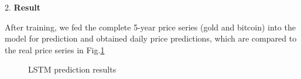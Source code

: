 \documentclass{mcmthesis}
\begin{document}
2. \textbf{Result}

After training, we fed the complete 5-year price series (gold and bitcoin) into the model for prediction 
and obtained daily price predictions, which are compared to the real price series in Fig.\ref{fig:predict}

\begin{figure}[H]
	\centering
	\caption{LSTM prediction results}
	\label{fig:predict}
\end{figure}
\end{document}
